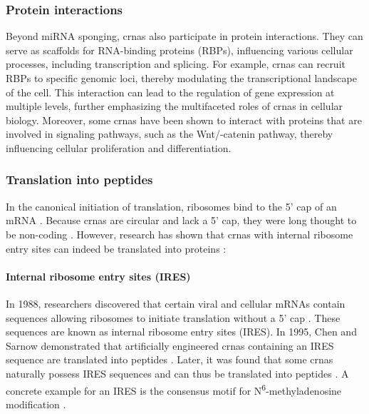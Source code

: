 \subsubsection{Protein interactions}
Beyond miRNA sponging, \gls{crna}s also participate in protein interactions.
They can serve as scaffolds for RNA-binding proteins (RBPs), influencing
various cellular processes, including transcription and
splicing\supercite{li_comprehensive_2017,qu_emerging_2017}.
For example, \gls{crna}s can recruit RBPs to specific genomic loci, thereby
modulating the transcriptional landscape of the
cell\supercite{li_comprehensive_2017}.
This interaction can lead to the regulation of gene expression at multiple
levels, further emphasizing the multifaceted roles of \gls{crna}s in cellular
biology\supercite{zhang_important_2024,he_targeting_2021}.
Moreover, some \gls{crna}s have been shown to interact with proteins that are
involved in signaling pathways, such as the Wnt/\textbeta{}-catenin pathway,
thereby influencing cellular proliferation and
differentiation\supercite{peng_novel_2021}.

\subsubsection{Translation into peptides}
In the canonical initiation of translation, ribosomes bind to the 5' cap of an
mRNA \supercite{hinnebusch_mechanism_2012}.
Because \gls{crna}s are circular and lack a 5' cap, they were long thought to
be non-coding \supercite{bao_regulatory_2019,greene_circular_2017}.
However, research has shown that \gls{crna}s with internal ribosome entry sites
can indeed be translated into proteins \supercite{chen_expanding_2020}:

\paragraph{Internal ribosome entry sites (IRES)} In 1988, researchers
discovered that certain viral and cellular mRNAs contain sequences allowing
ribosomes to initiate translation without a 5' cap
\supercite{pelletier_internal_1988, jang_segment_1988}.
These sequences are known as internal ribosome entry sites (IRES).
In 1995, Chen and Sarnow demonstrated that artificially engineered \gls{crna}s
containing an IRES sequence are translated into peptides
\supercite{chen_initiation_1995}.
Later, it was found that some \gls{crna}s naturally possess IRES sequences and
can thus be translated into peptides
\supercite{chen_expanding_2020,legnini_circ-znf609_2017,pamudurti_translation_2017}.
A concrete example for an IRES is the consensus motif for
N\textsuperscript{6}-methyladenosine modification
\supercite{yang_extensive_2017}.

